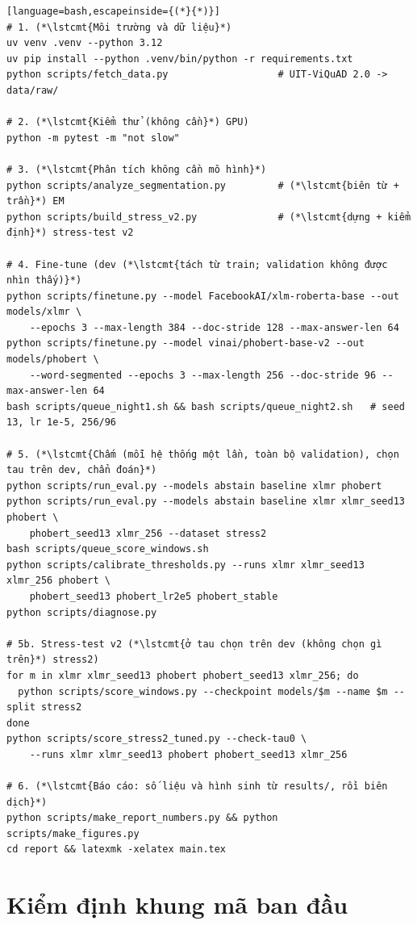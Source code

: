 \begin{lstlisting}[language=bash,escapeinside={(*}{*)}]
# 1. (*\lstcmt{Môi trường và dữ liệu}*)
uv venv .venv --python 3.12
uv pip install --python .venv/bin/python -r requirements.txt
python scripts/fetch_data.py                   # UIT-ViQuAD 2.0 -> data/raw/

# 2. (*\lstcmt{Kiểm thử (không cần}*) GPU)
python -m pytest -m "not slow"

# 3. (*\lstcmt{Phân tích không cần mô hình}*)
python scripts/analyze_segmentation.py         # (*\lstcmt{biên từ + trần}*) EM
python scripts/build_stress_v2.py              # (*\lstcmt{dựng + kiểm định}*) stress-test v2

# 4. Fine-tune (dev (*\lstcmt{tách từ train; validation không được nhìn thấy)}*)
python scripts/finetune.py --model FacebookAI/xlm-roberta-base --out models/xlmr \
    --epochs 3 --max-length 384 --doc-stride 128 --max-answer-len 64
python scripts/finetune.py --model vinai/phobert-base-v2 --out models/phobert \
    --word-segmented --epochs 3 --max-length 256 --doc-stride 96 --max-answer-len 64
bash scripts/queue_night1.sh && bash scripts/queue_night2.sh   # seed 13, lr 1e-5, 256/96

# 5. (*\lstcmt{Chấm (mỗi hệ thống một lần, toàn bộ validation), chọn tau trên dev, chẩn đoán}*)
python scripts/run_eval.py --models abstain baseline xlmr phobert
python scripts/run_eval.py --models abstain baseline xlmr xlmr_seed13 phobert \
    phobert_seed13 xlmr_256 --dataset stress2
bash scripts/queue_score_windows.sh
python scripts/calibrate_thresholds.py --runs xlmr xlmr_seed13 xlmr_256 phobert \
    phobert_seed13 phobert_lr2e5 phobert_stable
python scripts/diagnose.py

# 5b. Stress-test v2 (*\lstcmt{ở tau chọn trên dev (không chọn gì trên}*) stress2)
for m in xlmr xlmr_seed13 phobert phobert_seed13 xlmr_256; do
  python scripts/score_windows.py --checkpoint models/$m --name $m --split stress2
done
python scripts/score_stress2_tuned.py --check-tau0 \
    --runs xlmr xlmr_seed13 phobert phobert_seed13 xlmr_256

# 6. (*\lstcmt{Báo cáo: số liệu và hình sinh từ results/, rồi biên dịch}*)
python scripts/make_report_numbers.py && python scripts/make_figures.py
cd report && latexmk -xelatex main.tex
\end{lstlisting}

\section{Kiểm định khung mã ban đầu}
\label{app:legacy}

